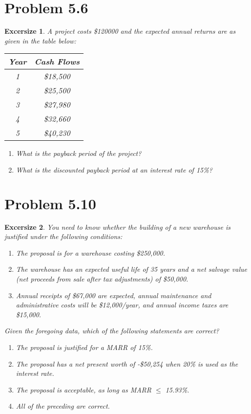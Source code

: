 \documentclass[../INDE250HW.tex]{subfiles}
\newtheorem{exrc}{Excersize}
\begin{document}
\section*{Problem 5.6}
\begin{exrc}
    A project costs \$120000 and the expected annual returns are as given in the table below:
    \begin{center}
        \begin{tabular}{ c c }
            Year & Cash Flows \\
            \hline
            1   &   \$18,500 \\
            2   &   \$25,500 \\
            3   &   \$27,980 \\
            4   &   \$32,660 \\
            5   &   \$40,230
        \end{tabular}
    \end{center}
    \begin{enumerate}
        \item What is the payback period of the project?
        \item What is the discounted payback period at an interest rate of 15\%?
    \end{enumerate}
\end{exrc}

\section*{Problem 5.10}
\begin{exrc}
    You need to know whether the building of a new warehouse is justified under the following conditions:
    \begin{enumerate}
        \item The proposal is for a warehouse costing \$250,000.
        \item The warehouse has an expected useful life of 35 years and a net salvage value (net proceeds from sale after tax adjustments) of \$50,000.
        \item Annual receipts of \$67,000 are expected, annual maintenance and administrative costs will be \$12,000/year, and annual income taxes are \$15,000.
    \end{enumerate}
    Given the foregoing data, which of the following statements are correct?
    \begin{enumerate}
        \item The proposal is justified for a MARR of 15\%.
        \item The proposal has a net present worth of -\$50,254 when 20\% is used as the interest rate.
        \item The proposal is acceptable, as long as MARR $\leq$ 15.93\%.
        \item All of the preceding are correct.
    \end{enumerate}
\end{exrc}
\end{document}
